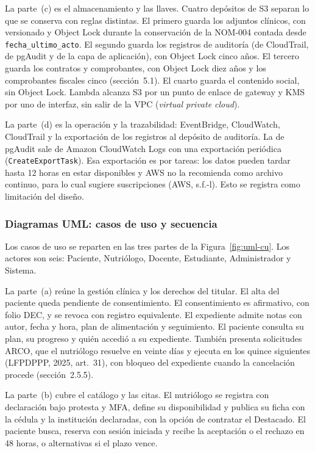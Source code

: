 \documentclass[12pt, a4paper]{article}
\begin{document}
La parte~(c) es el almacenamiento y las llaves. Cuatro depósitos de S3
separan lo que se conserva con reglas distintas. El primero guarda los
adjuntos clínicos, con versionado y Object Lock durante la conservación
de la NOM-004 contada desde \texttt{fecha\_ultimo\_acto}. El segundo
guarda los registros de auditoría (de CloudTrail, de pgAudit y de la capa
de aplicación), con Object Lock cinco años. El tercero guarda los
contratos y comprobantes, con Object Lock diez años y los comprobantes
fiscales cinco (sección~5.1). El cuarto guarda el contenido social, sin
Object Lock. Lambda alcanza S3 por un punto de enlace de gateway y KMS
por uno de interfaz, sin salir de la VPC (\textit{virtual private cloud}).

La parte~(d) es la operación y la trazabilidad: EventBridge, CloudWatch,
CloudTrail y la exportación de los registros al depósito de auditoría.
La de pgAudit sale de Amazon CloudWatch Logs con una exportación
periódica (\texttt{CreateExportTask}). Esa exportación es por tareas:
los datos pueden tardar hasta 12 horas en estar disponibles y AWS no la
recomienda como archivo continuo, para lo cual sugiere suscripciones
(AWS, s.f.-l). Esto se registra como limitación del diseño.

\subsubsection{Diagramas UML: casos de uso y secuencia}

Los casos de uso se reparten en las tres partes de la
Figura~\ref{fig:uml-cu}. Los actores son seis: Paciente, Nutriólogo,
Docente, Estudiante, Administrador y Sistema.

La parte~(a) reúne la gestión clínica y los derechos del titular. El
alta del paciente queda pendiente de consentimiento. El consentimiento
es afirmativo, con folio DEC, y se revoca con registro equivalente. El
expediente admite notas con autor, fecha y hora, plan de alimentación y
seguimiento. El paciente consulta su plan, su progreso y quién accedió a
su expediente. También presenta solicitudes ARCO, que el nutriólogo
resuelve en veinte días y ejecuta en los quince siguientes (LFPDPPP,
2025, art.~31), con bloqueo del expediente cuando la cancelación procede
(sección~2.5.5).

La parte~(b) cubre el catálogo y las citas. El nutriólogo se registra
con declaración bajo protesta y MFA, define su disponibilidad y publica
su ficha con la cédula y la institución declaradas, con la opción de
contratar el Destacado. El paciente busca, reserva con sesión iniciada y
recibe la aceptación o el rechazo en 48 horas, o alternativas si el
plazo vence.
\end{document}
